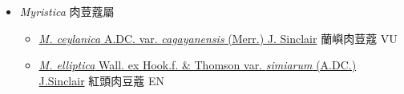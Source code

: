
  \begin{itemize}
 \item[] \textit{Myristica} 肉荳蔻屬
                    
  \begin{itemize}
        \item[] \href{http://www.theplantlist.org/tpl1.1/search?q=Myristica+ceylanica+var.+cagayanensis}{\textit{M. ceylanica} A.DC. var. \textit{cagayanensis} (Merr.) J. Sinclair}   蘭嶼肉荳蔻 VU
        \item[] \href{http://www.theplantlist.org/tpl1.1/search?q=Myristica+elliptica+var.+simiarum}{\textit{M. elliptica} Wall. ex Hook.f. \& Thomson var. \textit{simiarum} (A.DC.) J.Sinclair}   紅頭肉豆蔻 EN
  \end{itemize}
  \end{itemize}
